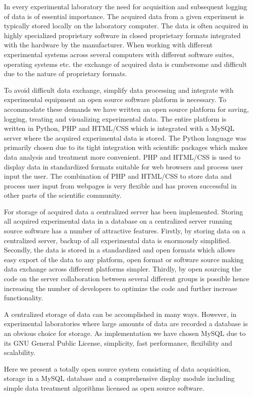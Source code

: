 In every experimental laboratory the need for acquisition and subsequent
logging of data is of essential importance. The acquired data from a given
experiment is typically stored locally on the laboratory computer. The data is
often acquired in highly specialized proprietary software in closed proprietary
formats integrated with the hardware by the manufacturer. When working with
different experimental systems across several computers with different software
suites, operating systems etc. the exchange of acquired data is cumbersome and
difficult due to the nature of proprietary formats.

To avoid difficult data exchange, simplify data processing and integrate with
experimental equipment an open source software platform is
necessary\cite{Benn2009,Murray2011,So2007}. To accommodate these demands we
have written an open source platform for saving, logging, treating and
visualizing experimental data. The entire platform is written in Python, PHP
and HTML/CSS which is integrated with a MySQL server where the acquired
experimental data is stored. The Python language was primarily chosen due to
its tight integration with scientific packages which makes data analysis and
treatment more convenient\cite{Cahn2007}. PHP and HTML/CSS is used to display
data in standardized formats suitable for web browsers and process user input
the user. The combination of PHP and HTML/CSS to store data and process user
input from webpages is very flexible and has proven successful in other parts
of the scientific community\cite{Crane2008}.

For storage of acquired data a centralized server has been implemented. Storing
all acquired experimental data in a database on a centralized server running
source software has a number of attractive features. Firstly, by storing data
on a centralized server, backup of all experimental data is enormously
simplified. Secondly, the data is stored in a standardized and open formats
which allows easy export of the data to any platform, open format or software
source making data exchange across different platforms simpler. Thirdly, by
open sourcing the code on the server collaboration between several different
groups is possible hence increasing the number of developers to optimize the
code and further increase functionality. 

A centralized storage of data can be accomplished in many ways. However, in
experimental laboratories where large amounts of data are recorded a database
is an obvious choice for storage. As implementation we have chosen MySQL due to
its GNU General Public License, simplicity, fast performance, flexibility and
scalability.

Here we present a totally open source system consisting of data acquisition,
storage in a MySQL database and a comprehensive display module including simple
data treatment algorithms licensed as open source software.
